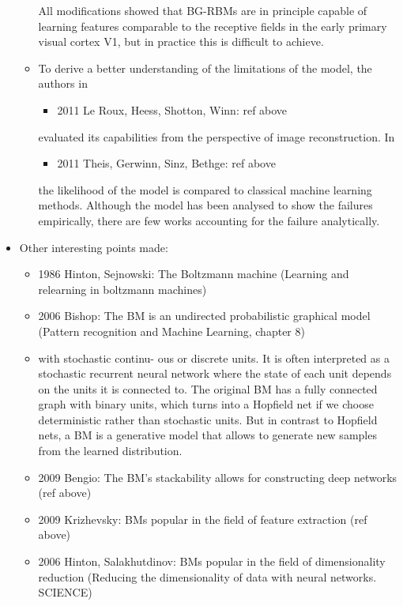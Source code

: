 \documentclass[twoside,english]{uiofysmaster}
\begin{document}
\begin{itemize}
\begin{itemize}
\begin{itemize}
		\end{itemize}
		All modifications showed that BG-RBMs are in principle capable of learning features comparable to the receptive fields in the early primary visual cortex V1, but in practice this is difficult to achieve.
		\item To derive a better understanding of the limitations of the model, the authors in
		\begin{itemize}
			\item 2011 Le Roux, Heess, Shotton, Winn: ref above \cite{LeRoux2011}
		\end{itemize} 
		evaluated its capabilities from the perspective of image reconstruction. In
		\begin{itemize}
			\item 2011 Theis, Gerwinn, Sinz, Bethge: ref above \cite{Theis2011}
		\end{itemize} 
		the likelihood of the model is compared to classical machine learning methods. Although the model has been analysed to show the failures empirically, there are few works accounting for the failure analytically.
	\end{itemize}
	\item Other interesting points made:
	\begin{itemize}
		\item 1986 Hinton, Sejnowski: The Boltzmann machine (Learning and relearning in boltzmann machines) \cite{Hinton1986}
		\item 2006 Bishop: The BM is an undirected probabilistic graphical model (Pattern recognition  and Machine Learning, chapter 8) \cite{Bishop2006}
		\item with stochastic continu- ous or discrete units. It is often interpreted as a stochastic recurrent neural network where the state of each unit depends on the units it is connected to. The original BM has a fully connected graph with binary units, which turns into a Hopfield net if we choose deterministic rather than stochastic units. But in contrast to Hopfield nets, a BM is a generative model that allows to generate new samples from the learned distribution.
		\item 2009 Bengio: The BM's stackability allows for constructing deep networks \cite{Bengio2009} (ref above)
		\item 2009 Krizhevsky: BMs popular in the field of feature extraction (ref above) \cite{Krizhevsky2009}
		\item 2006 Hinton, Salakhutdinov: BMs popular in the field of dimensionality reduction (Reducing the dimensionality of data with neural networks. SCIENCE) \cite{Hinton2006}

\end{itemize}
\end{itemize}
\end{document}
